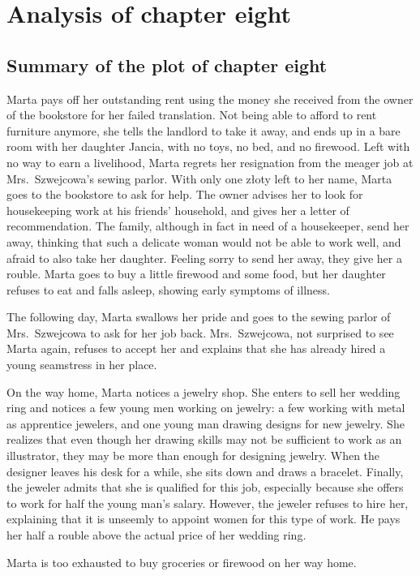 \section{Analysis of chapter eight}

\subsection{Summary of the plot of chapter eight}

Marta pays off her outstanding rent using the money she received from the owner of the bookstore for her failed translation.
Not being able to afford to rent furniture anymore, she tells the landlord to take it away, and ends up in a bare room with her daughter Jancia, with no toys, no bed, and no firewood.
Left with no way to earn a livelihood, Marta regrets her resignation from the meager job at Mrs.\ Szwejcowa's sewing parlor.
With only one złoty left to her name, Marta goes to the bookstore to ask for help.
The owner advises her to look for housekeeping work at his friends' household, and gives her a letter of recommendation.
The family, although in fact in need of a housekeeper, send her away, thinking that such a delicate woman would not be able to work well, and afraid to also take her daughter.
Feeling sorry to send her away, they give her a rouble. %
Marta goes to buy a little firewood and some food, but her daughter refuses to eat and falls asleep, showing early symptoms of illness.

The following day, Marta swallows her pride and goes to the sewing parlor of Mrs.\ Szwejcowa to ask for her job back.
Mrs.\ Szwejcowa, not surprised to see Marta again, refuses to accept her and explains that she has already hired a young seamstress in her place.

On the way home, Marta notices a jewelry shop.
She enters to sell her wedding ring and notices a few young men working on jewelry: a few working with metal as apprentice jewelers, and one young man drawing designs for new jewelry.
She realizes that even though her drawing skills may not be sufficient to work as an illustrator, they may be more than enough for designing jewelry.
When the designer leaves his desk for a while, she sits down and draws a bracelet.
Finally, the jeweler admits that she is qualified for this job, especially because she offers to work for half the young man's salary.
However, the jeweler refuses to hire her, explaining that it is unseemly to appoint women for this type of work.
He pays her half a rouble above the actual price of her wedding ring.

Marta is too exhausted to buy groceries or firewood on her way home.
